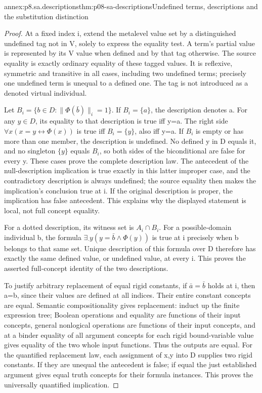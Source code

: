 \begin{annexitem}{annex:p8.sa.descriptions}{thm:p08-sa-descriptions}{Undefined terms, descriptions and the substitution distinction}
\begin{proof}
At a fixed index i, extend the metalevel value set by a distinguished
undefined tag not in V, solely to express the equality test. A
term's partial value is represented by its V value when defined
and by that tag otherwise. The source equality is exactly ordinary
equality of these tagged values. It is reflexive, symmetric and
transitive in all cases, including two undefined terms; precisely
one undefined term is unequal to a defined one. The tag is not
introduced as a denoted virtual individual.

Let \(B_i=\{b\in D:\|\Phi(\bar b)\|_i=1\}\).
If \(B_i=\{a\}\), the description denotes a. For any
\(y\in D\), its equality to that description is true iff
y=a. The right side \(\forall x(x=y\leftrightarrow\Phi(x))\)
is true iff \(B_i=\{y\}\), also iff y=a. If \(B_i\)
is empty or has more than one member, the description is undefined.
No defined y in D equals it, and no singleton \(\{y\}\)
equals \(B_i\), so both sides of the biconditional are false
for every y. These cases prove the complete description law.
The antecedent of the null-description implication is true
exactly in this latter improper case, and the contradictory
description is always undefined; the source equality then makes
the implication's conclusion true at i. If the original description
is proper, the implication has false antecedent. This explains
why the displayed statement is local, not full concept equality.

For a dotted description, its witness set is
\(A_i\cap B_i\). For a possible-domain individual b, the
formula \(\exists_{\cdot}y(y=\bar b\land\Phi(y))\)
is true at i precisely when b belongs to that same set. Unique
description of this formula over D therefore has exactly the
same defined value, or undefined value, at every i. This proves
the asserted full-concept identity of the two descriptions.

To justify arbitrary replacement of equal rigid constants, if
\(\bar a=\bar b\) holds at i, then a=b, since their values
are defined at all indices. Their entire constant concepts are
equal. Semantic compositionality gives replacement: induct up
the finite expression tree; Boolean operations and equality are
functions of their input concepts, general nonlogical operations
are functions of their input concepts, and at a binder equality
of all argument concepts for each rigid bound-variable value
gives equality of the two whole input functions. Thus the outputs
are equal. For the quantified replacement law, each assignment
of x,y into D supplies two rigid constants. If they are unequal
the antecedent is false; if equal the just established argument
gives equal truth concepts for their formula instances. This
proves the universally quantified implication.


\end{proof}
\end{annexitem}
